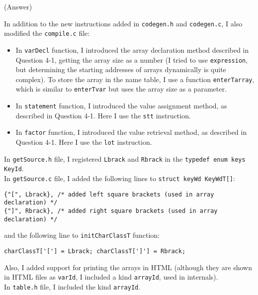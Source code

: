 \documentclass{article}
\begin{document}
\ifreport
(Answer)\\
\fi

In addition to the new instructions added in {\tt codegen.h} and
 {\tt codegen.c}, I also modified the {\tt compile.c} file:

\begin{itemize}
    \item In {\tt varDecl} function, I introduced the array declaration method
    described in Question 4-1, getting the array size as a number (I tried to
    use {\tt expression}, but determining the starting addresses of arrays
    dynamically is quite complex). To store the array in the name table, I
    use a function {\tt enterTarray}, which is similar to {\tt enterTvar}
    but uses the array size as a parameter.
    \item In {\tt statement} function, I introduced the value assignment
    method, as described in Question 4-1. Here I use the {\tt stt} instruction.
    \item In {\tt factor} function, I introduced the value retrieval method,
    as described in Question 4-1. Here I use the {\tt lot} instruction.
\end{itemize}

In {\tt getSource.h} file, I registered {\tt Lbrack} and {\tt Rbrack} in the
{\tt typedef  enum  keys KeyId}.\\

In {\tt getSource.c} file, I added the following lines to
{\tt struct keyWd KeyWdT[]}:

\begin{verbatim}
{"[", Lbrack}, /* added left square brackets (used in array declaration) */
{"]", Rbrack}, /* added right square brackets (used in array declaration) */
\end{verbatim}

and the following line to {\tt initCharClassT} function:

\begin{verbatim}
charClassT['['] = Lbrack; charClassT[']'] = Rbrack;
\end{verbatim}

Also, I added support for printing the arrays in HTML (although they are shown
in HTML files as {\tt varId}, I included a kind {\tt arrayId}, used in
internals).\\

In {\tt table.h} file, I included the kind {\tt arrayId}.\\
\end{document}
